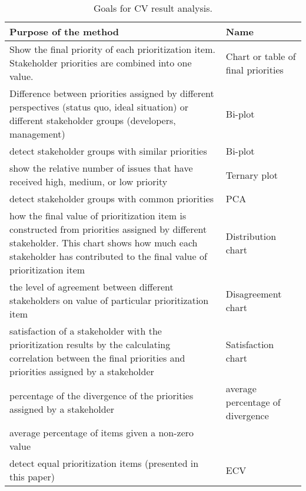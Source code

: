 \begin{table}
	\scriptsize
\caption{Goals for CV result analysis.}
\label{goals_for_methods}

\begin{tabular}{|>{\raggedright}p{}|>{\raggedright}p{}|}
\hline 
Purpose of the method & Name\tabularnewline
\hline

Show the final priority of each prioritization item. Stakeholder priorities
are combined into one value. & 
Chart or table of final priorities\tabularnewline
\hline 

Difference between priorities assigned by different perspectives (status
quo, ideal situation) or different stakeholder groups (developers,
management) \cite{Chatzipetrou2010}& 
Bi-plot \tabularnewline
\hline 

detect stakeholder groups with similar priorities \cite{Chatzipetrou2010}& Bi-plot \tabularnewline
\hline 

show the relative number of issues that have received high, medium,
or low priority \cite{Chatzipetrou2010}& Ternary plot \tabularnewline
\hline 

detect stakeholder groups with common priorities \cite{Chatzipetrou2010}& PCA \tabularnewline
\hline 

how the final value of prioritization item is constructed from priorities
assigned by different stakeholder. This chart shows how much each
stakeholder has contributed to the final value of prioritization item \cite{Regnell2000}& Distribution chart  \tabularnewline
\hline 

the level of agreement between different stakeholders on value of
particular prioritization item \cite{Regnell2000} & 
Disagreement chart  \tabularnewline
\hline 

satisfaction of a stakeholder with the prioritization results by the
calculating correlation between the final priorities and priorities
assigned by a stakeholder \cite{Regnell2000}& 
Satisfaction chart\tabularnewline
\hline 

percentage of the divergence of the priorities assigned by a stakeholder \cite{Berander2006a} & 
average percentage of divergence\tabularnewline
\hline 
average percentage of items given a non-zero value \cite{Berander2006a} & \tabularnewline
\hline 

detect equal prioritization items (presented in this paper)& 
ECV \tabularnewline
\hline
\end{tabular}
\end{table}

